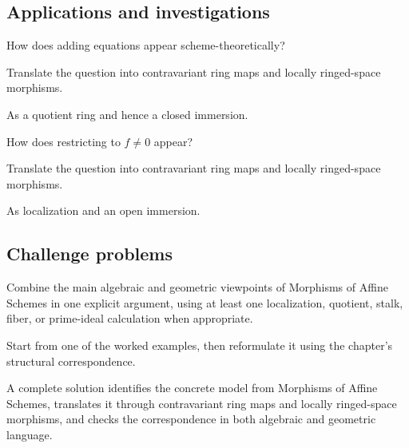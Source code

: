 \subsection*{Applications and investigations}

\begin{exercise}\label{exr:vi19-expand-13}
How does adding equations appear scheme-theoretically?
\end{exercise}
\begin{hint}
Translate the question into contravariant ring maps and locally ringed-space morphisms.
\end{hint}
\begin{solution}
As a quotient ring and hence a closed immersion.
\end{solution}

\begin{exercise}\label{exr:vi19-expand-14}
How does restricting to $f\ne0$ appear?
\end{exercise}
\begin{hint}
Translate the question into contravariant ring maps and locally ringed-space morphisms.
\end{hint}
\begin{solution}
As localization and an open immersion.
\end{solution}

\subsection*{Challenge problems}

\begin{exercise}\label{exr:vi19-expand-15}
Combine the main algebraic and geometric viewpoints of Morphisms of Affine Schemes in one explicit argument, using at least one localization, quotient, stalk, fiber, or prime-ideal calculation when appropriate.
\end{exercise}
\begin{hint}
Start from one of the worked examples, then reformulate it using the chapter's structural correspondence.
\end{hint}
\begin{solution}
A complete solution identifies the concrete model from Morphisms of Affine Schemes, translates it through contravariant ring maps and locally ringed-space morphisms, and checks the correspondence in both algebraic and geometric language.
\end{solution}

